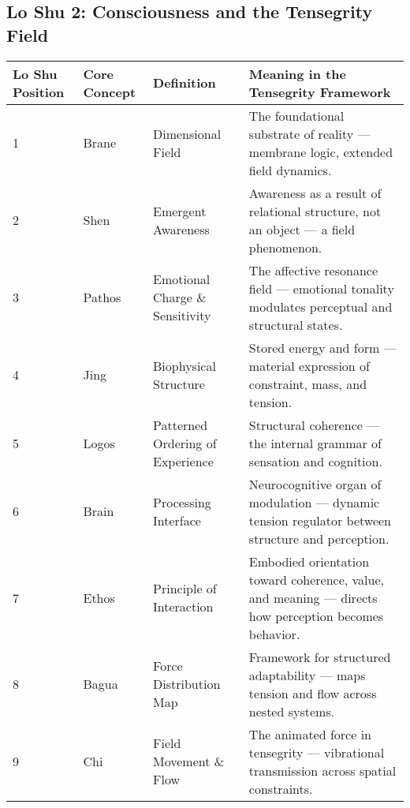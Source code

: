 \documentclass{article}
\begin{document}
\begin{landscape}

\section*{Lo Shu 2: Consciousness and the Tensegrity Field}

\renewcommand{\arraystretch}{1.4}

\begin{tabular}{|p{1.8cm}|p{3cm}|p{5.5cm}|p{8.5cm}|}
\hline
\textbf{Lo Shu Position} & 
\textbf{Core Concept} & 
\textbf{Definition} & 
\textbf{Meaning in the Tensegrity Framework} \\
\hline

1 & 
Brane & 
Dimensional Field & 
The foundational substrate of reality — membrane logic, extended field dynamics. \\
\hline

2 & 
Shen & 
Emergent Awareness & 
Awareness as a result of relational structure, not an object — a field phenomenon. \\
\hline

3 & 
Pathos & 
Emotional Charge \& Sensitivity & 
The affective resonance field — emotional tonality modulates perceptual and structural states. \\
\hline

4 & 
Jing & 
Biophysical Structure & 
Stored energy and form — material expression of constraint, mass, and tension. \\
\hline

5 & 
Logos & 
Patterned Ordering of Experience & 
Structural coherence — the internal grammar of sensation and cognition. \\
\hline

6 & 
Brain & 
Processing Interface & 
Neurocognitive organ of modulation — dynamic tension regulator between structure and perception. \\
\hline

7 & 
Ethos & 
Principle of Interaction & 
Embodied orientation toward coherence, value, and meaning — directs how perception becomes behavior. \\
\hline

8 & 
Bagua & 
Force Distribution Map & 
Framework for structured adaptability — maps tension and flow across nested systems. \\
\hline

9 & 
Chi & 
Field Movement \& Flow & 
The animated force in tensegrity — vibrational transmission across spatial constraints. \\
\hline

\end{tabular}

\end{landscape}
\end{document}
